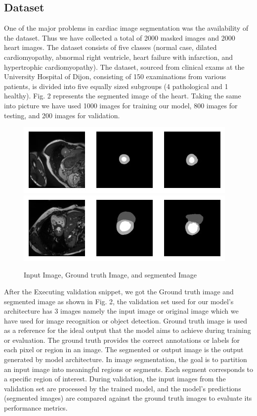 \documentclass[runningheads]{llncs}
\begin{document}
\subsection{Dataset}
 One of the major problems in cardiac image segmentation was the availability of the dataset. Thus we have collected a total of 2000 masked images and 2000 heart images. The dataset consists of five classes (normal case, dilated cardiomyopathy, abnormal right ventricle, heart failure with infarction, and hypertrophic cardiomyopathy). The dataset, sourced from clinical exams at the University Hospital of Dijon, consisting of 150 examinations from various patients, is divided into five equally sized subgroups (4 pathological and 1 healthy). Fig. 2 represents the segmented image of the heart. Taking the same into picture we have used 1000 images for training our model, 800 images for testing, and 200 images for validation.

 \begin{figure}[h]
    \centering
    \includegraphics[scale=0.6]{validationset1.jpg}
    \centering
    \includegraphics[scale=0.6]{validationset2.jpg}
    \caption{Input Image, Ground truth Image, and segmented Image}
    \label{fig:spectogram}
\end{figure}
After the Executing validation snippet, we got the Ground truth image and segmented image as shown in Fig. 2, the validation set used for our model’s architecture has 3 images namely the input image or original image which we have used for image recognition or object detection. Ground truth image is used as a reference for the ideal output that the model aims to achieve during training or evaluation. The ground truth provides the correct annotations or labels for each pixel or region in an image. The segmented or output image is the output generated by model architecture. In image segmentation, the goal is to partition an input image into meaningful regions or segments. Each segment corresponds to a specific region of interest. During validation, the input images from the validation set are processed by the trained model, and the model’s predictions (segmented images) are compared against the ground truth images to evaluate its performance metrics.
 
\end{document}
